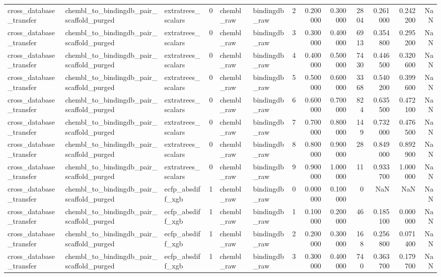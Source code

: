 \begin{longtable}{lllrllrrrrrrr}
cross\_database\_transfer & chembl\_to\_bindingdb\_pair\_scaffold\_purged & extratrees\_scalars & 0 & chembl\_raw & bindingdb\_raw & 2 & 0.200000 & 0.300000 & 2804 & 0.261000 & 0.242200 & NaN \\
cross\_database\_transfer & chembl\_to\_bindingdb\_pair\_scaffold\_purged & extratrees\_scalars & 0 & chembl\_raw & bindingdb\_raw & 3 & 0.300000 & 0.400000 & 6913 & 0.354800 & 0.295200 & NaN \\
cross\_database\_transfer & chembl\_to\_bindingdb\_pair\_scaffold\_purged & extratrees\_scalars & 0 & chembl\_raw & bindingdb\_raw & 4 & 0.400000 & 0.500000 & 7430 & 0.446500 & 0.320600 & NaN \\
cross\_database\_transfer & chembl\_to\_bindingdb\_pair\_scaffold\_purged & extratrees\_scalars & 0 & chembl\_raw & bindingdb\_raw & 5 & 0.500000 & 0.600000 & 3368 & 0.540200 & 0.399600 & NaN \\
cross\_database\_transfer & chembl\_to\_bindingdb\_pair\_scaffold\_purged & extratrees\_scalars & 0 & chembl\_raw & bindingdb\_raw & 6 & 0.600000 & 0.700000 & 824 & 0.635500 & 0.472100 & NaN \\
cross\_database\_transfer & chembl\_to\_bindingdb\_pair\_scaffold\_purged & extratrees\_scalars & 0 & chembl\_raw & bindingdb\_raw & 7 & 0.700000 & 0.800000 & 149 & 0.732000 & 0.476500 & NaN \\
cross\_database\_transfer & chembl\_to\_bindingdb\_pair\_scaffold\_purged & extratrees\_scalars & 0 & chembl\_raw & bindingdb\_raw & 8 & 0.800000 & 0.900000 & 28 & 0.849000 & 0.892900 & NaN \\
cross\_database\_transfer & chembl\_to\_bindingdb\_pair\_scaffold\_purged & extratrees\_scalars & 0 & chembl\_raw & bindingdb\_raw & 9 & 0.900000 & 1.000000 & 11 & 0.933700 & 1.000000 & NaN \\
cross\_database\_transfer & chembl\_to\_bindingdb\_pair\_scaffold\_purged & ecfp\_absdiff\_xgb & 1 & chembl\_raw & bindingdb\_raw & 0 & 0.000000 & 0.100000 & 0 & NaN & NaN & NaN \\
cross\_database\_transfer & chembl\_to\_bindingdb\_pair\_scaffold\_purged & ecfp\_absdiff\_xgb & 1 & chembl\_raw & bindingdb\_raw & 1 & 0.100000 & 0.200000 & 46 & 0.185100 & 0.000000 & NaN \\
cross\_database\_transfer & chembl\_to\_bindingdb\_pair\_scaffold\_purged & ecfp\_absdiff\_xgb & 1 & chembl\_raw & bindingdb\_raw & 2 & 0.200000 & 0.300000 & 168 & 0.256800 & 0.071400 & NaN \\
cross\_database\_transfer & chembl\_to\_bindingdb\_pair\_scaffold\_purged & ecfp\_absdiff\_xgb & 1 & chembl\_raw & bindingdb\_raw & 3 & 0.300000 & 0.400000 & 740 & 0.363700 & 0.179700 & NaN \\

\end{longtable}
